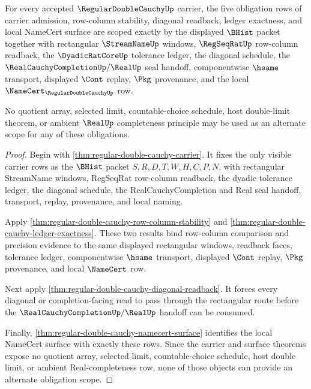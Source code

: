 \begin{theorem}
\label{thm:regular-double-cauchy-obligation-scope}
For every accepted $\RegularDoubleCauchyUp$ carrier, the five obligation rows of carrier admission, row-column stability, diagonal readback, ledger exactness, and local NameCert surface are scoped exactly by the displayed $\BHist$ packet together with rectangular $\StreamNameUp$ windows, $\RegSeqRatUp$ row-column readback, the $\DyadicRatCoreUp$ tolerance ledger, the diagonal schedule, the $\RealCauchyCompletionUp/\RealUp$ seal handoff, componentwise $\hsame$ transport, displayed $\Cont$ replay, $\Pkg$ provenance, and the local $\NameCert_{\RegularDoubleCauchyUp}$ row.

No quotient array, selected limit, countable-choice schedule, host double-limit theorem, or ambient $\RealUp$ completeness principle may be used as an alternate scope for any of these obligations.
\end{theorem}
\begin{proof}
Begin with \autoref{thm:regular-double-cauchy-carrier}. It fixes the only visible carrier rows as the $\BHist$ packet $S,R,D,T,W,H,C,P,N$, with rectangular StreamName windows, RegSeqRat row-column readback, the dyadic tolerance ledger, the diagonal schedule, the RealCauchyCompletion and Real seal handoff, transport, replay, provenance, and local naming.

Apply \autoref{thm:regular-double-cauchy-row-column-stability} and \autoref{thm:regular-double-cauchy-ledger-exactness}. These two results bind row-column comparison and precision evidence to the same displayed rectangular windows, readback faces, tolerance ledger, componentwise $\hsame$ transport, displayed $\Cont$ replay, $\Pkg$ provenance, and local $\NameCert$ row.

Next apply \autoref{thm:regular-double-cauchy-diagonal-readback}. It forces every diagonal or completion-facing read to pass through the rectangular route before the $\RealCauchyCompletionUp/\RealUp$ handoff can be consumed.

Finally, \autoref{thm:regular-double-cauchy-namecert-surface} identifies the local NameCert surface with exactly these rows. Since the carrier and surface theorems expose no quotient array, selected limit, countable-choice schedule, host double limit, or ambient Real-completeness row, none of those objects can provide an alternate obligation scope.
\end{proof}

